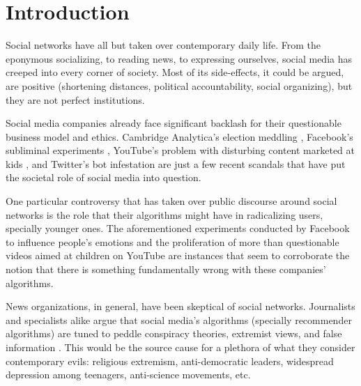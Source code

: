 
\chapter{Introduction}
\label{cap:introduction}


Social networks have all but taken over contemporary daily life. From the
eponymous socializing, to reading news, to expressing ourselves, social media
has creeped into every corner of society. Most of its side-effects, it could be
argued, are positive (shortening distances, political accountability, social
organizing), but they are not perfect institutions.

Social media companies already face significant backlash for their questionable
business model and ethics. Cambridge Analytica's election meddling \citep{}, %
Facebook's subliminal experiments \citep{}, YouTube's problem with disturbing %
content marketed at kids \citep{}, and Twitter's bot infestation \citep{} are %
just a few recent scandals that have put the societal role of social media into
question.

One particular controversy that has taken over public discourse around social
networks is the role that their algorithms might have in radicalizing users,
specially younger ones. The aforementioned experiments conducted by Facebook to
influence people's emotions and the proliferation of more than questionable
videos aimed at children on YouTube are instances that seem to corroborate the
notion that there is something fundamentally wrong with these companies'
algorithms.

News organizations, in general, have been skeptical of social networks.
Journalists and specialists alike argue that social media's algorithms
(specially recommender algorithms) are tuned to peddle conspiracy theories,
extremist views, and false information \citep{}. This would be the source cause %
for a plethora of what they consider contemporary evils: religious extremism,
anti-democratic leaders, widespread depression among teenagers, anti-science
movements, etc.

